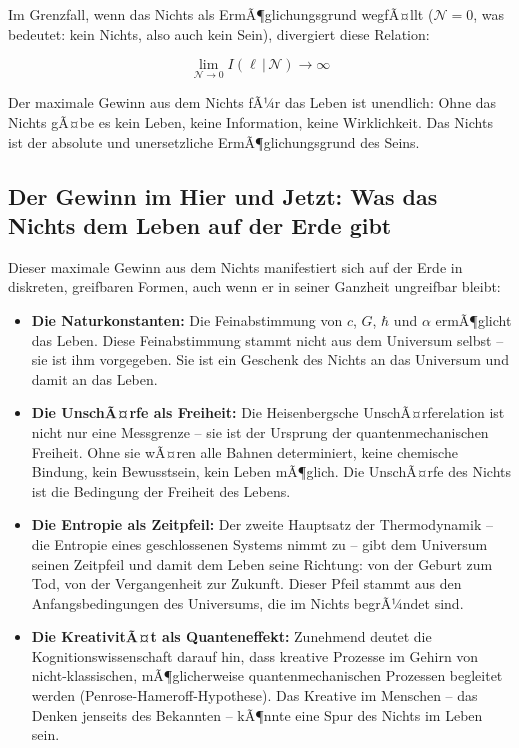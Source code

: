 ﻿\documentclass[12pt,a4paper]{report}
\begin{document}
Im Grenzfall, wenn das Nichts als ErmÃ¶glichungsgrund wegfÃ¤llt ($\mathcal{N} = 0$, was bedeutet: kein Nichts, also auch kein Sein), divergiert diese Relation:

\begin{equation}
	\lim_{\mathcal{N} \to 0} I(\ell\,|\,\mathcal{N}) \to \infty
	\label{eq:divergenz_ohne_nichts}
\end{equation}

Der maximale Gewinn aus dem Nichts fÃ¼r das Leben ist unendlich: Ohne das Nichts gÃ¤be es kein Leben, keine Information, keine Wirklichkeit. Das Nichts ist der absolute und unersetzliche ErmÃ¶glichungsgrund des Seins.

\subsection{Der Gewinn im Hier und Jetzt: Was das Nichts dem Leben auf der Erde gibt}

Dieser maximale Gewinn aus dem Nichts manifestiert sich auf der Erde in diskreten, greifbaren Formen, auch wenn er in seiner Ganzheit ungreifbar bleibt:

\begin{itemize}
	\item \textbf{Die Naturkonstanten:} Die Feinabstimmung von $c$, $G$, $\hbar$ und $\alpha$ ermÃ¶glicht das Leben. Diese Feinabstimmung stammt nicht aus dem Universum selbst -- sie ist ihm vorgegeben. Sie ist ein Geschenk des Nichts an das Universum und damit an das Leben.

	\item \textbf{Die UnschÃ¤rfe als Freiheit:} Die Heisenbergsche UnschÃ¤rferelation ist nicht nur eine Messgrenze -- sie ist der Ursprung der quantenmechanischen Freiheit. Ohne sie wÃ¤ren alle Bahnen determiniert, keine chemische Bindung, kein Bewusstsein, kein Leben mÃ¶glich. Die UnschÃ¤rfe des Nichts ist die Bedingung der Freiheit des Lebens.

	\item \textbf{Die Entropie als Zeitpfeil:} Der zweite Hauptsatz der Thermodynamik -- die Entropie eines geschlossenen Systems nimmt zu -- gibt dem Universum seinen Zeitpfeil und damit dem Leben seine Richtung: von der Geburt zum Tod, von der Vergangenheit zur Zukunft. Dieser Pfeil stammt aus den Anfangsbedingungen des Universums, die im Nichts begrÃ¼ndet sind.

	\item \textbf{Die KreativitÃ¤t als Quanteneffekt:} Zunehmend deutet die Kognitionswis\-senschaft darauf hin, dass kreative Prozesse im Gehirn von nicht-klassischen, mÃ¶glicherweise quantenmechanischen Prozessen begleitet werden (Penrose-Hameroff-Hypothese). Das Kreative im Menschen -- das Denken jenseits des Bekannten -- kÃ¶nnte eine Spur des Nichts im Leben sein.
\end{itemize}
\end{document}

